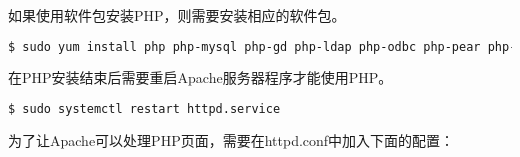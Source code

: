 如果使用软件包安装PHP，则需要安装相应的软件包。

\begin{lstlisting}[language=bash]
$ sudo yum install php php-mysql php-gd php-ldap php-odbc php-pear php-xml php-xmlrpc php-mbstring php-snmp php-soap curl curl-devel
\end{lstlisting}



在PHP安装结束后需要重启Apache服务器程序才能使用PHP。






\begin{lstlisting}[language=bash]
$ sudo systemctl restart httpd.service
\end{lstlisting}

为了让Apache可以处理PHP页面，需要在httpd.conf中加入下面的配置：



